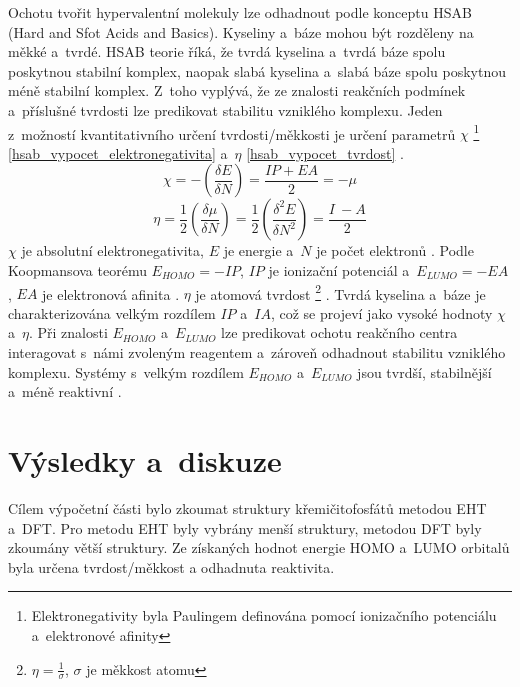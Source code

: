 \documentclass[
  printed, %
  table,   %
  lof,     %
  lot,     %
  oneside,
]{fithesis3}
\begin{document}
Ochotu tvořit hypervalentní molekuly lze odhadnout podle konceptu HSAB (Hard and Sfot Acids and Basics). Kyseliny a~báze mohou být rozděleny na měkké a~tvrdé. HSAB teorie říká, že tvrdá kyselina a~tvrdá báze spolu poskytnou stabilní komplex, naopak slabá kyselina a~slabá báze spolu poskytnou méně stabilní komplex. Z~toho vyplývá, že ze znalosti reakčních podmínek a~příslušné tvrdosti lze predikovat stabilitu vzniklého komplexu. Jeden z~možností kvantitativního určení tvrdosti/měkkosti je určení parametrů $\chi$ \footnote{Elektronegativity byla Paulingem definována pomocí ionizačního potenciálu a~elektronové afinity} \ref{hsab_vypocet_elektronegativita} a~$\eta$ \ref{hsab_vypocet_tvrdost} \cite{hsabclanek}. 
\begin{equation}
\chi = - \left( \frac{\delta E}{\delta N} \right) = \frac{IP + EA}{2} = -\mu
\label{hsab_vypocet_elektronegativita}
\end{equation} 
\begin{equation}
\eta = \frac{1}{2} \left( \frac{\delta \mu}{\delta N} \right) = \frac{1}{2}\left( \frac{\delta^2 E}{\delta N^2} \right) = \frac{I~- A}{2}
\label{hsab_vypocet_tvrdost}
\end{equation} 
$\chi$ je absolutní elektronegativita, $E$ je energie a~$N$ je počet elektronů \cite{hsabwatoc}. Podle Koopmansova teorému $E_{HOMO} = - IP$, $IP$ je ionizační potenciál a~$E_{LUMO} = -EA$, $EA$ je elektronová afinita \cite{kratochvilexcerpta}. $\eta$ je atomová tvrdost \footnote{$\eta = \frac{1}{\sigma}$, $\sigma$ je měkkost atomu} \cite{pearson1986absolute}. Tvrdá kyselina a~báze je charakterizována velkým rozdílem $IP$ a~$IA$, což se projeví jako vysoké hodnoty $\chi$ a~$\eta$. Při znalosti $E_{HOMO}$ a~$E_{LUMO}$ lze predikovat ochotu reakčního centra interagovat s~námi zvoleným reagentem a~zároveň odhadnout stabilitu vzniklého komplexu. Systémy s~velkým rozdílem $E_{HOMO}$ a~$E_{LUMO}$ jsou tvrdší, stabilnější a~méně reaktivní \cite{hsabwatoc}.




\chapter{Výsledky a~diskuze}
Cílem výpočetní části bylo zkoumat struktury křemičitofosfátů metodou EHT a~DFT. Pro metodu EHT byly vybrány menší struktury, metodou DFT byly zkoumány větší struktury. Ze získaných hodnot energie HOMO a~LUMO orbitalů byla určena tvrdost/měkkost a odhadnuta reaktivita.
\end{document}
